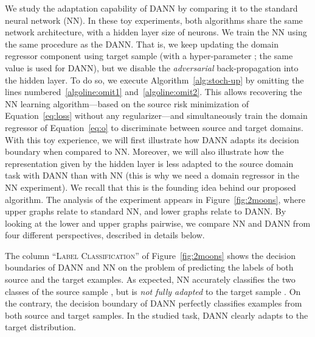 \documentclass[twoside,11pt]{article}
\begin{document}
We study the adaptation capability of DANN by comparing it to the standard neural network (NN).
In these toy experiments, both algorithms share the same network architecture, with a hidden layer size of  neurons. We train the NN using the same procedure as the DANN. That is, we keep updating the domain regressor component using target sample  (with a hyper-parameter ; the same value is used for DANN), but we disable the \emph{adversarial} back-propagation into the hidden layer. To do so, we execute Algorithm~\ref{alg:stoch-up} by omitting the lines numbered~\ref{algoline:omit1} and~\ref{algoline:omit2}.
This allows recovering the NN learning algorithm---based on the source risk minimization of Equation~\eqref{eq:loss} without any regularizer---and simultaneously train the domain regressor of Equation~\eqref{eq:o} to discriminate between source and target domains. With this toy experience, we will first illustrate how DANN adapts its decision boundary when compared to NN.
Moreover, we will also illustrate how the representation given by the hidden layer is less adapted to the source domain task with DANN than with NN (this is why we need a domain regressor in the NN experiment). 
We recall that this is the founding idea behind our proposed algorithm.
The analysis of the experiment appears in Figure~\ref{fig:2moons}, where upper graphs relate to standard NN, and lower graphs relate to DANN. By looking at the lower and upper graphs pairwise, we compare NN and DANN from four different perspectives, described in details below.
\smallskip


The column ``\textsc{Label Classification}'' of Figure~\ref{fig:2moons} shows the decision boundaries of DANN and NN on the problem of predicting the labels of both source and the target examples. 
As expected, NN  accurately classifies the two classes of the source sample , but is  \emph{not fully adapted} to the target sample .
On the contrary, the decision boundary of DANN perfectly classifies examples from both source and target samples. In the studied task, DANN clearly adapts to the target distribution.
\smallskip
\end{document}
